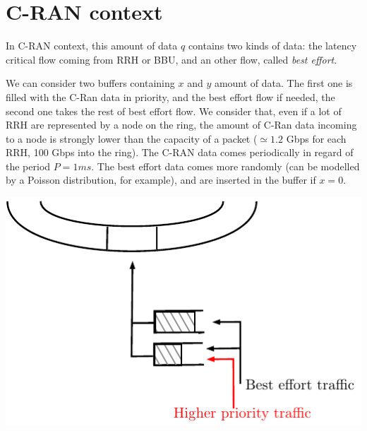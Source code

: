 \documentclass[a4paper,10pt]{article}
\begin{document}
\section{C-RAN context}

In C-RAN context, this amount of data $q$ contains two kinds of data: the latency critical flow coming from RRH or BBU, and an other flow, called {\em best effort}.

We can consider two buffers containing $x$ and $y$ amount of data. The first one is filled with the C-Ran data in priority, and the best effort flow if needed, the second one takes the rest of best effort flow. We consider that, even if a lot of RRH are represented by a node on the ring, the amount of C-Ran data incoming to a node is strongly lower than the capacity of a packet ($\simeq 1.2$ Gbps for each RRH, 100 Gbps into the ring).
The C-RAN data comes periodically in regard of the period $P = 1ms$. 
The best effort data comes more randomly (can be modelled by a Poisson distribution, for example), and are inserted in the buffer if $x = 0$.

\begin{center}   

      \includegraphics[scale=0.7]{insertion1.pdf}

  
\end{center}
 
 
\end{document}
